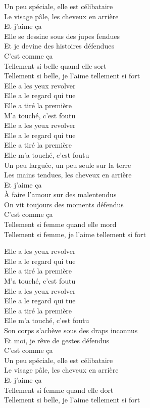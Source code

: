 \documentclass{novel}
\begin{document}
\begin{multicols}{2}
Un peu spéciale, elle est célibataire \\
Le visage pâle, les cheveux en arrière \\
Et j'aime ça \\
Elle se dessine sous des jupes fendues \\
Et je devine des histoires défendues \\
C'est comme ça \\
Tellement si belle quand elle sort \\
Tellement si belle, je l'aime tellement si fort \\

Elle a les yeux revolver \\
Elle a le regard qui tue \\
Elle a tiré la première \\
M'a touché, c'est foutu \\
Elle a les yeux revolver \\
Elle a le regard qui tue \\
Elle a tiré la première \\
Elle m'a touché, c'est foutu \\

Un peu larguée, un peu seule sur la terre \\
Les mains tendues, les cheveux en arrière \\
Et j'aime ça \\
À faire l'amour sur des malentendus \\
On vit toujours des moments défendus \\
C'est comme ça \\

Tellement si femme quand elle mord \\
Tellement si femme, je l'aime tellement si fort \\
\columnbreak

Elle a les yeux revolver \\
Elle a le regard qui tue \\
Elle a tiré la première \\
M'a touché, c'est foutu \\
Elle a les yeux revolver \\
Elle a le regard qui tue \\
Elle a tiré la première \\
Elle m'a touché, c'est foutu \\

Son corps s'achève sous des draps inconnus \\
Et moi, je rêve de gestes défendus \\
C'est comme ça \\
Un peu spéciale, elle est célibataire \\
Le visage pâle, les cheveux en arrière \\
Et j'aime ça \\
Tellement si femme quand elle dort \\
Tellement si belle, je l'aime tellement si fort \\


\end{multicols}
\end{document}
